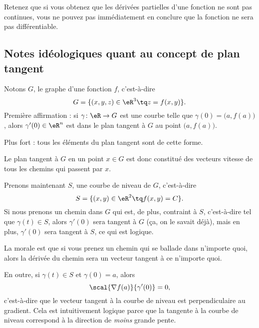 Retenez que si vous obtenez que les dérivées partielles d'une fonction ne sont pas continues, vous ne pouvez pas immédiatement en conclure que la fonction ne sera pas différentiable.


\subsection{Notes idéologiques quant au concept de plan tangent}
\label{ssecConceptPlanTag}

Notons \( G\), le graphe d'une fonction \( f\), c'est-à-dire
\begin{equation}
	G=\{ (x,y,z)\in\eR^3\tq z=f(x,y) \}.
\end{equation}
Première affirmation : si \( \gamma\colon \eR\to G\) est une courbe telle que \( \gamma(0)=\big( a,f(a) \big)\), alors \( \gamma'(0)\in\eR^n\) est dans le plan tangent à \( G\) au point \( \big( a,f(a) \big)\).

Plus fort : tous les éléments du plan tangent sont de cette forme.

Le plan tangent à \( G\) en un point \( x\in G\) est donc constitué des vecteurs vitesse de tous les chemins qui passent par \( x\).

Prenons maintenant \( S\), une courbe de niveau de \( G\), c'est-à-dire
\begin{equation}
	S=\{ (x,y)\in\eR^2\tq f(x,y)=C \}.
\end{equation}
Si nous prenons un chemin dans \( G\) qui est, de plus, contraint à \( S\), c'est-à-dire tel que \( \gamma(t)\in S\), alors \( \gamma'(0)\) sera tangent à \( G\) (ça, on le savait déjà), mais en plus, \( \gamma'(0)\) sera tangent à \( S\), ce qui est logique.

La morale est que si vous prenez un chemin qui se ballade dans n'importe quoi, alors la dérivée du chemin sera un vecteur tangent à ce n'importe quoi.

En outre, si \( \gamma(t)\in S\) et \( \gamma(0)=a\), alors
\begin{equation}
	\scal{\nabla f(a)}{\gamma'(0)}=0,
\end{equation}
c'est-à-dire que le vecteur tangent à la courbe de niveau est perpendiculaire au gradient. Cela est intuitivement logique parce que la tangente à la courbe de niveau correspond à la direction de \emph{moins} grande pente.


